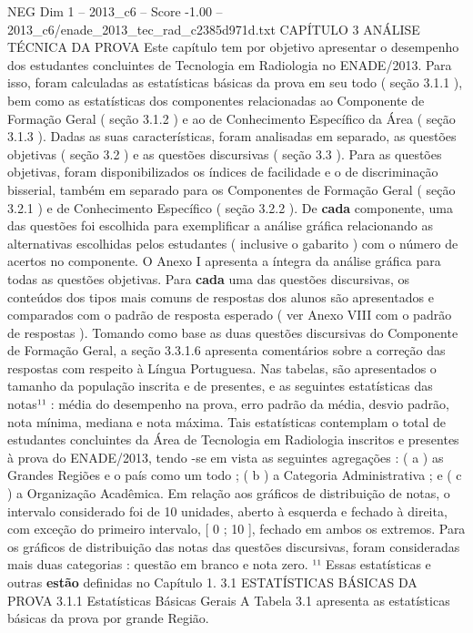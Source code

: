 \begin{textsample}{NEG Dim 1 – 2013\_c6 – Score -1.00 – 2013\_c6/enade\_2013\_tec\_rad\_c2385d971d.txt}  \label{ex:f1_neg_270}
CAPÍTULO 3 ANÁLISE TÉCNICA DA PROVA Este capítulo tem por objetivo apresentar o desempenho dos estudantes concluintes de Tecnologia em Radiologia no ENADE/2013.
Para isso, foram calculadas as estatísticas básicas da prova em seu todo ( seção 3.1.1 ), bem como as estatísticas dos componentes relacionadas ao Componente de Formação Geral ( seção 3.1.2 ) e ao de Conhecimento Específico da Área ( seção 3.1.3 ).
Dadas as suas características, foram analisadas em separado, as questões objetivas ( seção 3.2 ) e as questões discursivas ( seção 3.3 ).
Para as questões objetivas, foram disponibilizados os índices de facilidade e o de discriminação bisserial, também em separado para os Componentes de Formação Geral ( seção 3.2.1 ) e de Conhecimento Específico ( seção 3.2.2 ).
De \textbf{cada} componente, uma das questões foi escolhida para exemplificar a análise gráfica relacionando as alternativas escolhidas pelos estudantes ( inclusive o gabarito ) com o número de acertos no componente.
O Anexo I apresenta a íntegra da análise gráfica para todas as questões objetivas.
Para \textbf{cada} uma das questões discursivas, os conteúdos dos tipos mais comuns de respostas dos alunos são apresentados e comparados com o padrão de resposta esperado ( ver Anexo VIII com o padrão de respostas ).
Tomando como base as duas questões discursivas do Componente de Formação Geral, a seção 3.3.1.6 apresenta comentários sobre a correção das respostas com respeito à Língua Portuguesa.
Nas tabelas, são apresentados o tamanho da população inscrita e de presentes, e as seguintes estatísticas das notas¹¹ : média do desempenho na prova, erro padrão da média, desvio padrão, nota mínima, mediana e nota máxima.
Tais estatísticas contemplam o total de estudantes concluintes da Área de Tecnologia em Radiologia inscritos e presentes à prova do ENADE/2013, tendo -se em vista as seguintes agregações : ( a ) as Grandes Regiões e o país como um todo ; ( b ) a Categoria Administrativa ; e ( c ) a Organização Acadêmica.
Em relação aos gráficos de distribuição de notas, o intervalo considerado foi de 10 unidades, aberto à esquerda e fechado à direita, com exceção do primeiro intervalo, [ 0 ; 10 ], fechado em ambos os extremos.
Para os gráficos de distribuição das notas das questões discursivas, foram consideradas mais duas categorias : questão em branco e nota zero. ¹¹ Essas estatísticas e outras \textbf{estão} definidas no Capítulo 1. 3.1 ESTATÍSTICAS BÁSICAS DA PROVA 3.1.1 Estatísticas Básicas Gerais A Tabela 3.1 apresenta as estatísticas básicas da prova por grande Região.

\end{textsample}
